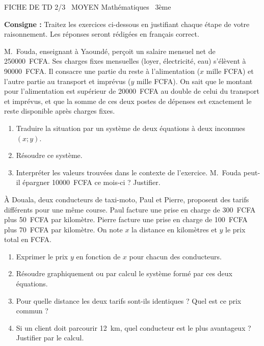 \documentclass[11pt]{article}
\begin{document}
\begin{tcolorbox}[enhanced,colback=popink,colframe=popink,arc=10pt,boxrule=0pt,left=12pt,right=12pt,top=9pt,bottom=9pt]
{\color{white}\popxbold\small FICHE DE TD 2/3 \textbullet\ MOYEN \hfill Mathématiques \textbullet\ 3ème\par}
\end{tcolorbox}
\vspace{4pt}
\noindent\textbf{Consigne :} Traitez les exercices ci-dessous en justifiant chaque étape de votre raisonnement. Les réponses seront rédigées en français correct.

\begin{exercice}
M.~Fouda, enseignant à Yaoundé, perçoit un salaire mensuel net de \SI{250000}{FCFA}. Ses charges fixes mensuelles (loyer, électricité, eau) s'élèvent à \SI{90000}{FCFA}. Il consacre une partie du reste à l'alimentation ($x$ mille FCFA) et l'autre partie au transport et imprévus ($y$ mille FCFA). On sait que le montant pour l'alimentation est supérieur de \SI{20000}{FCFA} au double de celui du transport et imprévus, et que la somme de ces deux postes de dépenses est exactement le reste disponible après charges fixes.
\begin{enumerate}
    \item Traduire la situation par un système de deux équations à deux inconnues $(x; y)$.
    \item Résoudre ce système.
    \item Interpréter les valeurs trouvées dans le contexte de l'exercice. M.~Fouda peut-il épargner \SI{10000}{FCFA} ce mois-ci ? Justifier.
\end{enumerate}
\end{exercice}

\begin{exercice}
À Douala, deux conducteurs de taxi-moto, Paul et Pierre, proposent des tarifs différents pour une même course. Paul facture une prise en charge de \SI{300}{FCFA} plus \SI{50}{FCFA} par kilomètre. Pierre facture une prise en charge de \SI{100}{FCFA} plus \SI{70}{FCFA} par kilomètre. On note $x$ la distance en kilomètres et $y$ le prix total en FCFA.
\begin{enumerate}
    \item Exprimer le prix $y$ en fonction de $x$ pour chacun des conducteurs.
    \item Résoudre graphiquement ou par calcul le système formé par ces deux équations.
    \item Pour quelle distance les deux tarifs sont-ils identiques ? Quel est ce prix commun ?
    \item Si un client doit parcourir \SI{12}{km}, quel conducteur est le plus avantageux ? Justifier par le calcul.
\end{enumerate}
\end{exercice}
\end{document}
